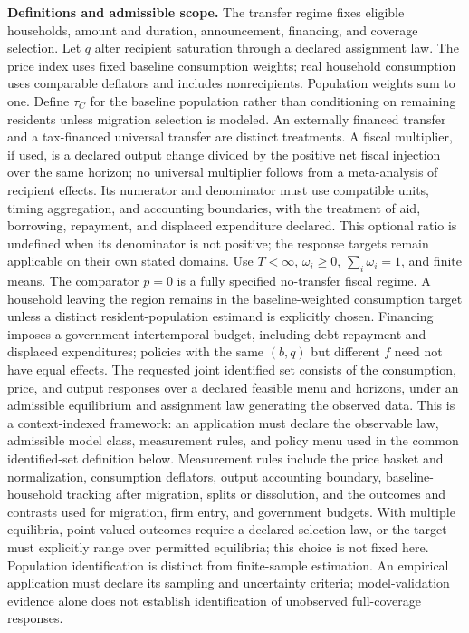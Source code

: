 \documentclass[11pt,a4paper]{article}
\begin{document}
\textbf{Definitions and admissible scope.} The transfer regime fixes eligible households, amount and duration, announcement, financing, and coverage selection. Let \(q\) alter recipient saturation through a declared assignment law. The price index uses fixed baseline consumption weights; real household consumption uses comparable deflators and includes nonrecipients. Population weights sum to one. Define \(\tau_C\) for the baseline population rather than conditioning on remaining residents unless migration selection is modeled. An externally financed transfer and a tax-financed universal transfer are distinct treatments. A fiscal multiplier, if used, is a declared output change divided by the positive net fiscal injection over the same horizon; no universal multiplier follows from a meta-analysis of recipient effects. Its numerator and denominator must use compatible units, timing aggregation, and accounting boundaries, with the treatment of aid, borrowing, repayment, and displaced expenditure declared. This optional ratio is undefined when its denominator is not positive; the response targets remain applicable on their own stated domains. Use \(T<\infty\), \(\omega_i\ge0\), \(\sum_i\omega_i=1\), and finite means. The comparator \(p=0\) is a fully specified no-transfer fiscal regime. A household leaving the region remains in the baseline-weighted consumption target unless a distinct resident-population estimand is explicitly chosen. Financing imposes a government intertemporal budget, including debt repayment and displaced expenditures; policies with the same \((b,q)\) but different \(f\) need not have equal effects. The requested joint identified set consists of the consumption, price, and output responses over a declared feasible menu and horizons, under an admissible equilibrium and assignment law generating the observed data. This is a context-indexed framework: an application must declare the observable law, admissible model class, measurement rules, and policy menu used in the common identified-set definition below. Measurement rules include the price basket and normalization, consumption deflators, output accounting boundary, baseline-household tracking after migration, splits or dissolution, and the outcomes and contrasts used for migration, firm entry, and government budgets. With multiple equilibria, point-valued outcomes require a declared selection law, or the target must explicitly range over permitted equilibria; this choice is not fixed here. Population identification is distinct from finite-sample estimation. An empirical application must declare its sampling and uncertainty criteria; model-validation evidence alone does not establish identification of unobserved full-coverage responses.
\end{document}
